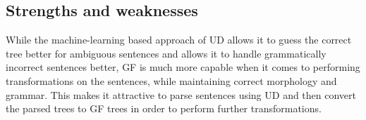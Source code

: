 \documentclass{article}
\begin{document}
\subsection{Strengths and weaknesses}

While the machine-learning based approach of UD allows it to guess the correct tree better for ambiguous sentences and allows it to handle grammatically incorrect sentences better, GF is much more capable when
it comes to performing transformations on the sentences, while maintaining correct morphology and grammar. This makes it attractive to parse sentences
using UD and then convert the parsed trees to GF trees in order to perform further transformations.







\end{document}
